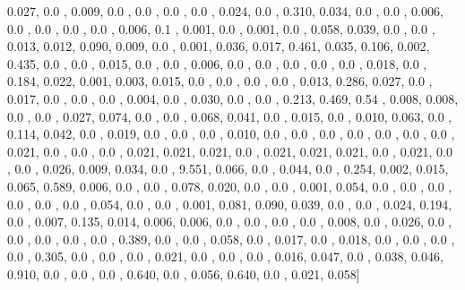 \documentclass[usenames,dvipsnames]{article} %
\begin{document}
0.027, 0.0  , 0.009, 0.0  , 0.0  , 0.0  , 0.0  , 0.024, 0.0  , 0.310, 0.034, 0.0  , 0.0  , 0.006, 0.0  , 0.0  , 0.0  , 0.0  , 0.006, 0.1  , 0.001, 0.0  , 0.001, 0.0  , 0.058, 0.039, 0.0  , 0.0  , 0.013, 0.012, 0.090, 0.009, 0.0  , 0.001, 0.036, 0.017, 0.461, 0.035, 0.106, 0.002, 0.435, 0.0  , 0.0  , 0.015, 0.0  , 0.0  , 0.006, 0.0  , 0.0  , 0.0  , 0.0  , 0.0  , 0.018, 0.0  , 0.184, 0.022, 0.001, 0.003, 0.015, 0.0  , 0.0  , 0.0  , 0.0  , 0.013, 0.286, 0.027, 0.0  , 0.017, 0.0  , 0.0  , 0.0  , 0.004, 0.0  , 0.030, 0.0  , 0.0  , 0.213, 0.469, 0.54 , 0.008, 0.008, 0.0  , 0.0  , 0.027, 0.074, 0.0  , 0.0  , 0.068, 0.041, 0.0  , 0.015, 0.0  , 0.010, 0.063, 0.0  , 0.114, 0.042, 0.0  , 0.019, 0.0  , 0.0  , 0.0  , 0.010, 0.0  , 0.0  , 0.0  , 0.0  , 0.0  , 0.0  , 0.0  , 0.021, 0.0  , 0.0  , 0.0  , 0.021, 0.021, 0.021, 0.0  , 0.021, 0.021, 0.021, 0.0  , 0.021, 0.0  , 0.0  , 0.026, 0.009, 0.034, 0.0  , 9.551, 0.066, 0.0  , 0.044, 0.0  , 0.254, 0.002, 0.015, 0.065, 0.589, 0.006, 0.0  , 0.0  , 0.078, 0.020, 0.0  , 0.0  , 0.001, 0.054, 0.0  , 0.0  , 0.0  , 0.0  , 0.0  , 0.0  , 0.054, 0.0  , 0.0  , 0.001, 0.081, 0.090, 0.039, 0.0  , 0.0  , 0.024, 0.194, 0.0  , 0.007, 0.135, 0.014, 0.006, 0.006, 0.0  , 0.0  , 0.0  , 0.0  , 0.008, 0.0  , 0.026, 0.0  , 0.0  , 0.0  , 0.0  , 0.0  , 0.389, 0.0  , 0.0  , 0.058, 0.0  , 0.017, 0.0  , 0.018, 0.0  , 0.0  , 0.0  , 0.0  , 0.305, 0.0  , 0.0  , 0.0  , 0.021, 0.0  , 0.0  , 0.0  , 0.016, 0.047, 0.0  , 0.038, 0.046, 0.910, 0.0  , 0.0  , 0.0  , 0.640, 0.0  , 0.056, 0.640, 0.0  , 0.021, 0.058]
\end{document}

